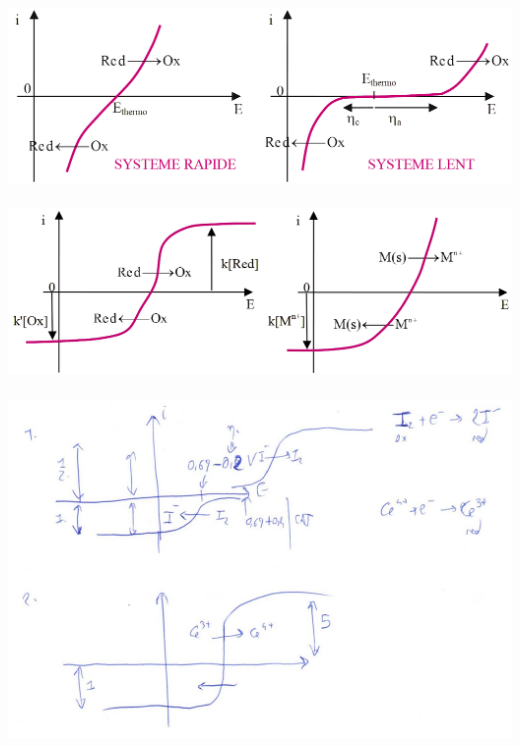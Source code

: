 \begin{solution}

~\includegraphics[width=\linewidth]{chimie/i-E/iE-cours.png}
~\includegraphics[width=\linewidth]{chimie/i-E/iE-cours2.png}
~\includegraphics[width=\linewidth]{chimie/i-E/iE-corr.jpg}

\end{solution}

